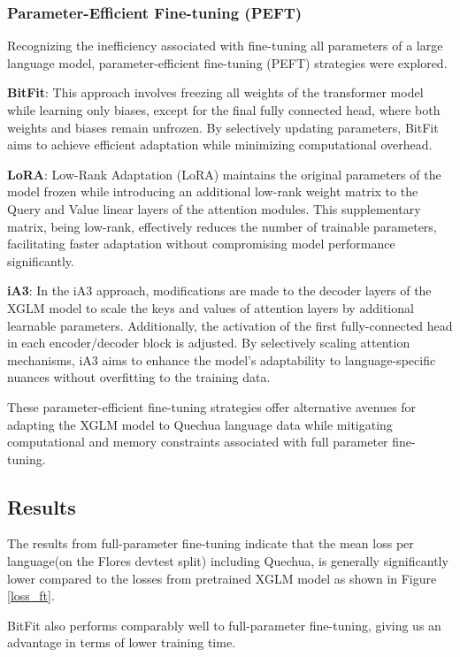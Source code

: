 \documentclass[11pt]{article}
\begin{document}
\subsubsection{Parameter-Efficient Fine-tuning (PEFT)}

Recognizing the inefficiency associated with fine-tuning all parameters of a large language model, parameter-efficient fine-tuning (PEFT) strategies were explored.

\textbf{BitFit}\cite{zaken2022bitfit}: This approach involves freezing all weights of the transformer model while learning only biases, except for the final fully connected head, where both weights and biases remain unfrozen. By selectively updating parameters, BitFit aims to achieve efficient adaptation while minimizing computational overhead.

\textbf{LoRA}\cite{hu2021lora}: Low-Rank Adaptation (LoRA) maintains the original parameters of the model frozen while introducing an additional low-rank weight matrix to the Query and Value linear layers of the attention modules. This supplementary matrix, being low-rank, effectively reduces the number of trainable parameters, facilitating faster adaptation without compromising model performance significantly.

\textbf{iA3}\cite{liu2022fewshot}: In the iA3 approach, modifications are made to the decoder layers of the XGLM model to scale the keys and values of attention layers by additional learnable parameters. Additionally, the activation of the first fully-connected head in each encoder/decoder block is adjusted. By selectively scaling attention mechanisms, iA3 aims to enhance the model's adaptability to language-specific nuances without overfitting to the training data.

These parameter-efficient fine-tuning strategies offer alternative avenues for adapting the XGLM model to Quechua language data while mitigating computational and memory constraints associated with full parameter fine-tuning.

\subsection{Results}
The results from full-parameter fine-tuning indicate that the mean loss per language(on the Flores devtest split) including Quechua, is generally significantly lower compared to the losses from pretrained XGLM model as shown in Figure \ref{loss_ft}.

BitFit also performs comparably well to full-parameter fine-tuning, giving us an advantage in terms of lower training time.   
\end{document}
